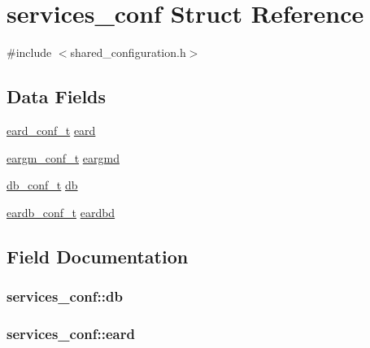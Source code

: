 \hypertarget{structservices__conf}{}\section{services\+\_\+conf Struct Reference}
\label{structservices__conf}


{\ttfamily \#include $<$shared\+\_\+configuration.\+h$>$}

\subsection*{Data Fields}
\begin{DoxyCompactItemize}
\item 
\hyperlink{cluster__conf_8h_ab58e601c68bae45a48eb70dc9dfe7d09}{eard\+\_\+conf\+\_\+t} \hyperlink{structservices__conf_a54c68e718c12fcec567fbaf64a3f2909}{eard}
\item 
\hyperlink{cluster__conf_8h_a75027be4ac348fc2af4a15e0429b469c}{eargm\+\_\+conf\+\_\+t} \hyperlink{structservices__conf_a548eebff8f4455edadd57275721aecac}{eargmd}
\item 
\hyperlink{cluster__conf_8h_aa0de47e5ae932430d21c17657d69c381}{db\+\_\+conf\+\_\+t} \hyperlink{structservices__conf_a90be7259b83c2ecef995639497b48129}{db}
\item 
\hyperlink{cluster__conf_8h_a058319658e76e00909caa695fe9c466b}{eardb\+\_\+conf\+\_\+t} \hyperlink{structservices__conf_ae1e895640252a923c4df253d1116e17f}{eardbd}
\end{DoxyCompactItemize}


\subsection{Field Documentation}
\subsubsection[{\texorpdfstring{db}{db}}]{ services\+\_\+conf\+::db}\hypertarget{structservices__conf_a90be7259b83c2ecef995639497b48129}{}\label{structservices__conf_a90be7259b83c2ecef995639497b48129}
\subsubsection[{\texorpdfstring{eard}{eard}}]{ services\+\_\+conf\+::eard}\hypertarget{structservices__conf_a54c68e718c12fcec567fbaf64a3f2909}{}\label{structservices__conf_a54c68e718c12fcec567fbaf64a3f2909}
